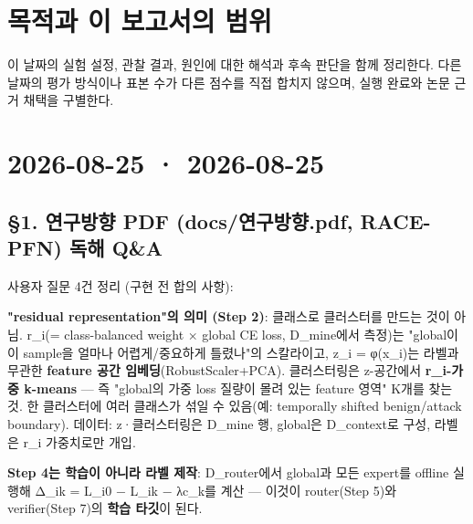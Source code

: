 




\section*{목적과 이 보고서의 범위}

이 날짜의 실험 설정, 관찰 결과, 원인에 대한 해석과 후속 판단을 함께 정리한다. 다른 날짜의 평가 방식이나 표본 수가 다른 점수를 직접 합치지 않으며, 실행 완료와 논문 근거 채택을 구별한다.


\section{2026-08-25 · 2026-08-25}
\label{report:20260825_0825}
\subsection{§1. 연구방향 PDF (docs/\allowbreak{}연구방향.pdf, RACE-PFN) 독해 Q\&A}
사용자 질문 4건 정리 (구현 전 합의 사항):

\par\noindent \textbullet\enspace \textbf{"residual representation"의 의미 (Step 2)}: 클래스로 클러스터를 만드는 것이 아님. r\_\allowbreak{}i(=\allowbreak{} class-balanced weight × global CE loss, D\_\allowbreak{}mine에서 측정)는 "global이 이 sample을 얼마나 어렵게/\allowbreak{}중요하게 틀렸나"의 스칼라이고, z\_\allowbreak{}i =\allowbreak{} φ(x\_\allowbreak{}i)는 라벨과 무관한 \textbf{feature 공간 임베딩}(RobustScaler+\allowbreak{}PCA). 클러스터링은 z-공간에서 \textbf{r\_\allowbreak{}i-가중 k-means} — 즉 "global의 가중 loss 질량이 몰려 있는 feature 영역" K개를 찾는 것. 한 클러스터에 여러 클래스가 섞일 수 있음(예: temporally shifted benign/\allowbreak{}attack boundary). 데이터: z·클러스터링은 D\_\allowbreak{}mine 행, global은 D\_\allowbreak{}context로 구성, 라벨은 r\_\allowbreak{}i 가중치로만 개입.


\par\noindent \textbullet\enspace \textbf{Step 4는 학습이 아니라 라벨 제작}: D\_\allowbreak{}router에서 global과 모든 expert를 offline 실행해 Δ\_\allowbreak{}ik =\allowbreak{} L\_\allowbreak{}i0 − L\_\allowbreak{}ik − λc\_\allowbreak{}k를 계산 — 이것이 router(Step 5)와 verifier(Step 7)의 \textbf{학습 타깃}이 된다.


